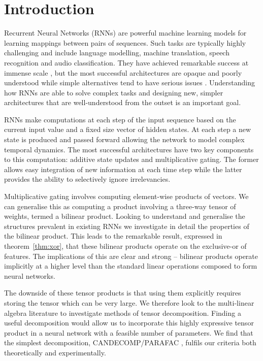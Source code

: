 \chapter{Introduction}\label{C:intro}
Recurrent Neural Networks (RNNs) are powerful machine learning models for learning mappings between
pairs of sequences. Such tasks are typically highly challenging and include language modelling,
machine translation, speech recognition and audio classification. They have achieved remarkable
success at immense scale \autocite{Wu2016a}, but the most successful architectures are
opaque and poorly understood while simple alternatives tend to have serious
issues \autocite{Bengio1994}. Understanding how RNNs are able to
solve complex tasks and designing new, simpler architectures that are well-understood from the
outset is an important goal.

RNNs make computations at each step of the input sequence based on the current input value and
a fixed size vector of hidden states. At each step a new state is produced and passed forward allowing
the network to model complex temporal dynamics. 
The most successful architectures have two key components to this computation:
additive state updates and multiplicative gating. The former allows easy integration of new information
at each time step while the latter provides the ability to selectively ignore irrelevancies. 

Multiplicative gating involves computing element-wise products of vectors. We can
generalise this as computing a product involving a three-way tensor of weights, termed
a bilinear product. Looking to understand and generalise the structures prevalent in
existing RNNs we investigate in detail the properties of the bilinear product. 
This leads to the remarkable
result, expressed in theorem~\ref{thm:xor}, that these bilinear products operate on the exclusive-or
of features. The implications of this are clear and strong -- bilinear products operate
implicitly at a higher level than the standard linear operations composed to form neural networks.

The downside of these tensor products is that using them explicitly requires storing the tensor which
can be very large. We therefore look to the multi-linear algebra literature to investigate methods of
tensor decomposition. Finding a useful decomposition would allow us to incorporate this highly expressive
tensor product in a neural network with a feasible number of parameters. We find that the simplest
decomposition, CANDECOMP/PARAFAC \autocite{Carroll1970, Harshman1970}, fulfils our criteria
both theoretically and experimentally.

